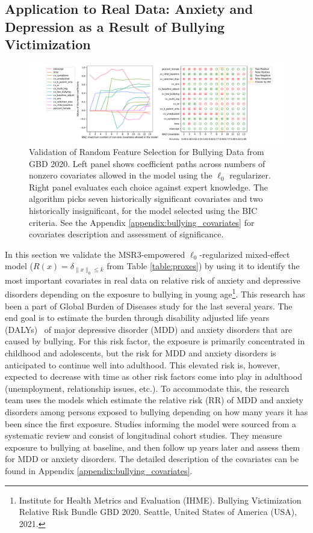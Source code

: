 \subsection{Application to Real Data: Anxiety and Depression as a Result of Bullying Victimization}
\label{sec:real}

\begin{figure}
    \centering
	\caption{\label{fig:bullying_data_random_feature_selection}Validation of Random Feature Selection for Bullying Data from GBD 2020. 
	Left panel shows coefficient paths across numbers of nonzero covariates allowed in the model using the $\ell_0$ regularizer. 
	Right panel evaluates each choice against expert knowledge. 
	The algorithm picks seven historically significant covariates and two historically insignificant, for the model selected using the BIC criteria. 
	See the Appendix \ref{appendix:bullying_covariates} for covariates description and assessment of significance.}
	\includegraphics[width=1\textwidth]{figures/bullying_data_assessment_selection}
\end{figure}

In this section we validate the MSR3-empowered $\ell_0$-regularized mixed-effect model ($R(x) = \delta_{\|x\|_0 \leq k}$ from Table \ref{table:proxes}) by using it to identify the most important covariates in real data on relative risk of anxiety and depressive disorders depending on the exposure to bullying in young age\footnote{Institute for Health Metrics and Evaluation (IHME). Bullying Victimization Relative Risk Bundle GBD 2020. Seattle, United States of America (USA), 2021.}. This research has been a part of Global Burden of Diseases study for the last several years. The end goal  is to estimate the burden 
{through disability adjusted life years} (DALYs)~\citep{murray1997understanding}
of major depressive disorder (MDD) and anxiety disorders that are caused by bullying. For this risk factor, the exposure is primarily concentrated in childhood and adolescents, but the risk for MDD and anxiety disorders is anticipated to continue well into adulthood. This elevated risk is, however, expected to decrease with time as other risk factors come into play in adulthood (unemployment, relationship issues, etc.). To accommodate this, the research team uses the models which estimate the relative risk (RR) of MDD and anxiety disorders among persons exposed to bullying depending on how many years it has been since the first exposure. Studies informing the model were sourced from a systematic review and consist of longitudinal cohort studies. They measure exposure to bullying at baseline, and then follow up years later and assess them for MDD or anxiety disorders. The detailed description of the covariates can be found in Appendix \ref{appendix:bullying_covariates}.

